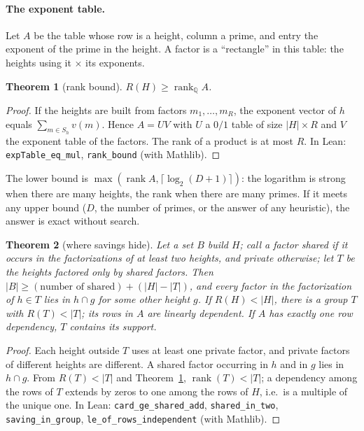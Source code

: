 \documentclass[11pt,a4paper]{article}
\theoremstyle{plain}
\newtheorem{theorem}{Theorem}[section]
\theoremstyle{definition}
\theoremstyle{remark}
\newcommand{\lean}[1]{\texttt{#1}}
\begin{document}
\paragraph{The exponent table.} Let $A$ be the table whose row is a height, column a prime, and entry the exponent of the prime in the height. A factor is a ``rectangle'' in this table: the heights using it $\times$ its exponents.

\begin{theorem}[rank bound]\label{thm:rank}
$R(H)\ge\operatorname{rank}_{\mathbb Q}A$.
\end{theorem}
\begin{proof}
If the heights are built from factors $m_1,\dots,m_R$, the exponent vector of $h$ equals $\sum_{m\in S_h}v(m)$. Hence $A=UV$ with $U$ a $0/1$ table of size $|H|\times R$ and $V$ the exponent table of the factors. The rank of a product is at most $R$. In Lean: \lean{expTable\_eq\_mul}, \lean{rank\_bound} (with Mathlib).
\end{proof}

The lower bound is $\max(\operatorname{rank}A,\lceil\log_2(D+1)\rceil)$: the logarithm is strong when there are many heights, the rank when there are many primes. If it meets any upper bound ($D$, the number of primes, or the answer of any heuristic), the answer is exact without search.

\begin{theorem}[where savings hide]\label{thm:tree}
Let a set $B$ build $H$; call a factor shared if it occurs in the factorizations of at least two heights, and private otherwise; let $T$ be the heights factored only by shared factors. Then $|B|\ge(\text{number of shared})+(|H|-|T|)$, and every factor in the factorization of $h\in T$ lies in $h\cap g$ for some other height $g$. If $R(H)<|H|$, there is a group $T$ with $R(T)<|T|$; its rows in $A$ are linearly dependent. If $A$ has exactly one row dependency, $T$ contains its support.
\end{theorem}
\begin{proof}
Each height outside $T$ uses at least one private factor, and private factors of different heights are different. A shared factor occurring in $h$ and in $g$ lies in $h\cap g$. From $R(T)<|T|$ and Theorem~\ref{thm:rank}, $\operatorname{rank}(T)<|T|$; a dependency among the rows of $T$ extends by zeros to one among the rows of $H$, i.e.\ is a multiple of the unique one. In Lean: \lean{card\_ge\_shared\_add}, \lean{shared\_in\_two}, \lean{saving\_in\_group}, \lean{le\_of\_rows\_independent} (with Mathlib).
\end{proof}
\end{document}
